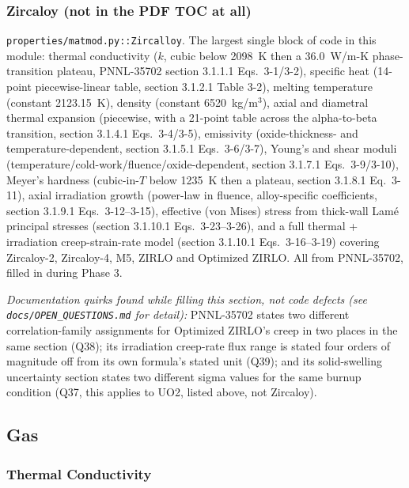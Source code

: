 \documentclass[11pt]{article}
\newcommand{\code}[1]{\texttt{#1}}
\begin{document}
\subsubsection*{Zircaloy (not in the PDF TOC at all)}

\code{properties/matmod.py::Zircalloy}. The largest single block of code in this
module: thermal conductivity ($k$, cubic below 2098~K then a 36.0~W/m-K phase-transition
plateau, PNNL-35702 section 3.1.1.1 Eqs.\ 3-1/3-2), specific heat (14-point
piecewise-linear table, section 3.1.2.1 Table 3-2), melting temperature (constant
2123.15~K), density (constant 6520~kg/m$^3$), axial and diametral thermal expansion
(piecewise, with a 21-point table across the alpha-to-beta transition, section 3.1.4.1
Eqs.\ 3-4/3-5), emissivity (oxide-thickness- and temperature-dependent, section 3.1.5.1
Eqs.\ 3-6/3-7), Young's and shear moduli (temperature/cold-work/fluence/oxide-dependent,
section 3.1.7.1 Eqs.\ 3-9/3-10), Meyer's hardness (cubic-in-$T$ below 1235~K then a
plateau, section 3.1.8.1 Eq.\ 3-11), axial irradiation growth (power-law in fluence,
alloy-specific coefficients, section 3.1.9.1 Eqs.\ 3-12--3-15), effective (von Mises)
stress from thick-wall Lam\'e principal stresses (section 3.1.10.1 Eqs.\ 3-23--3-26),
and a full thermal + irradiation creep-strain-rate model (section 3.1.10.1 Eqs.\
3-16--3-19) covering Zircaloy-2, Zircaloy-4, M5, ZIRLO and Optimized ZIRLO. All from
PNNL-35702, filled in during Phase 3.

\textit{Documentation quirks found while filling this section, not code defects (see
\code{docs/OPEN\_QUESTIONS.md} for detail):} PNNL-35702 states two different
correlation-family assignments for Optimized ZIRLO's creep in two places in the same
section (Q38); its irradiation creep-rate flux range is stated four orders of magnitude
off from its own formula's stated unit (Q39); and its solid-swelling uncertainty
section states two different sigma values for the same burnup condition (Q37, this
applies to UO2, listed above, not Zircaloy).

\subsection{Gas}

\subsubsection{Thermal Conductivity}
\end{document}

